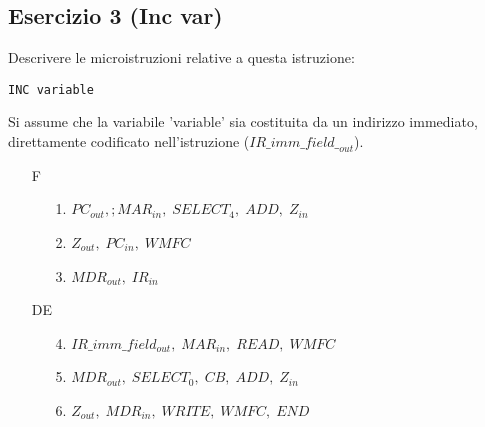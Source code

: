 \documentclass[a4paper]{article}
\theoremstyle{break}
\theoremstyle{break}
\theoremstyle{break}
\theoremstyle{break}
\begin{document}
\subsection{Esercizio 3 (Inc var)}
\vspace{2cm}
\begin{exercise}
  Descrivere le microistruzioni relative a questa istruzione:
  \begin{center}
    \texttt{INC variable}
  \end{center}
  Si assume che la variabile 'variable' sia costituita da un indirizzo immediato, direttamente codificato nell'istruzione ($IR\_imm\_field\__{out}$).

  \begin{enumerate}
    \item [F]
      \begin{enumerate}
        \item [1.] \( PC_{out},; MAR_{in},\; SELECT_4,\; ADD,\; Z_{in} \) 
        \item [2.] \( Z_{out},\; PC_{in},\; WMFC \) 
        \item [3.] \( MDR_{out},\; IR_{in} \) 
      \end{enumerate}
    \item [DE]
      \begin{enumerate}
        \item [4.] \( IR\_imm\_field_{out},\; MAR_{in},\; READ,\; WMFC \)
        \item [5.] \( MDR_{out},\; SELECT_0,\; CB,\; ADD,\; Z_{in} \) 
        \item [6.] \( Z_{out},\; MDR_{in},\; WRITE,\; WMFC,\; END \) 
      \end{enumerate}
  \end{enumerate}
\end{exercise}
\end{document}
